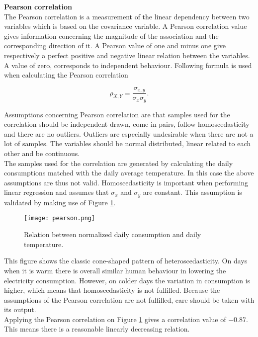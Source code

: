 \textbf{Pearson correlation}\\
The Pearson correlation is a measurement of the linear dependency between two variables which is based on the covariance variable. A Pearson correlation value gives information concerning the magnitude of the association and the corresponding direction of it. A Pearson value of one and minus one give respectively a perfect positive and negative linear relation between the variables. A value of zero, corresponds to independent behaviour. Following formula is used when calculating the Pearson correlation

\begin{equation}\label{eq:pearson}
	\rho_{X,Y} = \frac{\sigma_{x,y}}{\sigma_x\sigma_y}.
\end{equation}

Assumptions concerning Pearson correlation are that samples used for the correlation should be independent drawn, come in pairs, follow homoscedasticity and there are no outliers. Outliers are especially undesirable when there are not a lot of samples. The variables should be normal distributed, linear related to each other and be continuous.\\
The samples used for the correlation are generated by calculating the daily consumptions matched with the daily average temperature. In this case the above assumptions are thus not valid. Homoscedasticity is important when performing linear regression and assumes that $ \sigma_x $ and $ \sigma_y $ are constant. This assumption is validated by making use of Figure \ref{fig:pearson}.

\begin{figure}[h!]
	\centering
	\texttt{[image: pearson.png]}
	\caption{Relation between normalized daily consumption and daily temperature.}
	\label{fig:pearson}
\end{figure}

This figure shows the classic cone-shaped pattern of heteroscedasticity. On days when it is warm there is overall similar human behaviour in lowering the electricity consumption. However, on colder days the variation in consumption is higher, which means that homoscedasticity is not fulfilled. Because the assumptions of the Pearson correlation are not fulfilled, care should be taken with its output.\\

Applying the Pearson correlation on Figure \ref{fig:pearson} gives a correlation value of $ -0.87 $. This means there is a reasonable linearly decreasing relation.\\


